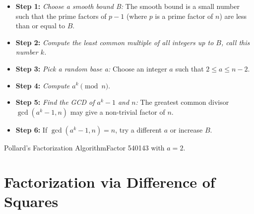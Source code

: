 \begin{itemize}
    \item \textbf{Step 1:} \textit{Choose a smooth bound B:} The smooth bound is a small number such that the prime factors of \(p - 1\) (where \(p\) is a prime factor of \(n\)) are less than or equal to \(B\).
    \item \textbf{Step 2:} \textit{Compute the least common multiple of all integers up to \(B\), call this number \(k\).}
    \item \textbf{Step 3:} \textit{Pick a random base a:} Choose an integer \(a\) such that \(2 \leq a \leq n - 2\).
    \item \textbf{Step 4:} \textit{Compute \(a^{k} \pmod{n}\)}.
    \item \textbf{Step 5:} \textit{Find the GCD of \(a^k - 1\) and \(n\):} The greatest common divisor \(\gcd(a^k - 1, n)\) may give a non-trivial factor of \(n\).
    \item \textbf{Step 6:} If \(\gcd(a^k - 1,n) = n\), try a different \(a\) or increase \(B\).
\end{itemize}

\begin{example}
    {Pollard's Factorization Algorithm}Factor 540143 with \(a = 2\).
\end{example}


\section{Factorization via Difference of Squares}


